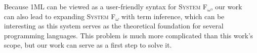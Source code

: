 \documentclass{spbau-diploma}
\begin{document}
Because \textsc{1ML} can be viewed as a user-friendly syntax for \textsc{System F\textsubscript{$\omega$}}, our work can also lead to expanding \textsc{System F\textsubscript{$\omega$}} with term inference, which can be interesting as this system serves as the theoretical foundation for several programming languages. This problem is much more complicated than this work's scope, but our work can serve as a first step to solve it.



\end{document}
